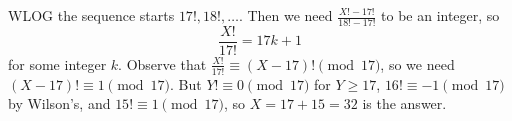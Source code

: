 WLOG the sequence starts $17!,18!,\ldots$. Then we need $\frac{X!-17!}{18!-17!}$ to be an integer, so \[\frac{X!}{17!}=17k+1\] for some integer $k$. Observe that $\frac{X!}{17!}\equiv\left(X-17\right)!\pmod{17}$, so we need $\left(X-17\right)!\equiv1\pmod{17}$. But $Y!\equiv0\pmod{17}$ for $Y\geq17$, $16!\equiv-1\pmod{17}$ by Wilson's, and $15!\equiv1\pmod{17}$, so $X=17+15=\boxed{32}$ is the answer.